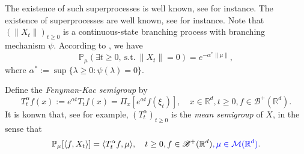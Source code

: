 \documentclass[12pt,oneside,english]{amsart}
\theoremstyle{plain}
\theoremstyle{definition}
\numberwithin{equation}{section}
\newcommand{\added}[1]{{\color{blue}#1}}\newcommand{\deleted}[1]{{\color{red}#1}}
\begin{document}
\deleted{
	The existence of such superprocesses is well known, see \cite{EB} for instance.
}
\added{
	The existence of superprocesses are well known, see \cite{EB} for instance.
}
    Note that $(\|X_t\|)_{t\geq 0}$ is a continuous-state branching process with branching mechanism $\psi$.
    According to \cite[Theorem 12.5 \& Theorem 12.7]{Kyprianou2014Fluctuations}, we have
\begin{equation}
    \mathbb{P}_{\mu} (\exists t\geq 0,~\text{s.t.}~\|X_t\|=0)
    = e^{-\alpha^* \|\mu\|},
\end{equation}
    where $\alpha^* := \sup\{\lambda \geq 0: \psi(\lambda) = 0\}$.

    Define the \emph{Fenyman-Kac semigroup} by
\begin{equation}\label{meansemigroup}
    T^{\alpha}_t f(x)
    :=
    e^{\alpha t} T_t f(x) =
    \Pi_x [e^{\alpha t}f(\xi_t)],
    \quad x\in \mathbb{R}^d,t\geq 0, f\in \mathscr B^+(\mathbb R^d).
\end{equation}
    It is konwn that, see \cite[Proposition 2.27]{Li2011Measure-valued} for example, $(T^\alpha_t)_{t\geq 0}$ is the \emph{mean semigroup} of $X$, in the sense that
\begin{equation}\label{eq:meanformula}
    \mathbb{P}_{\mu}[\langle f, X_t \rangle]
    = \langle T_t^\alpha f, \mu \rangle,
    \quad t\geq 0, f\in \mathscr B^+(\mathbb R^d)\added{, \mu \in \mathcal M(\mathbb R^d)}.
\end{equation}
\end{document}

